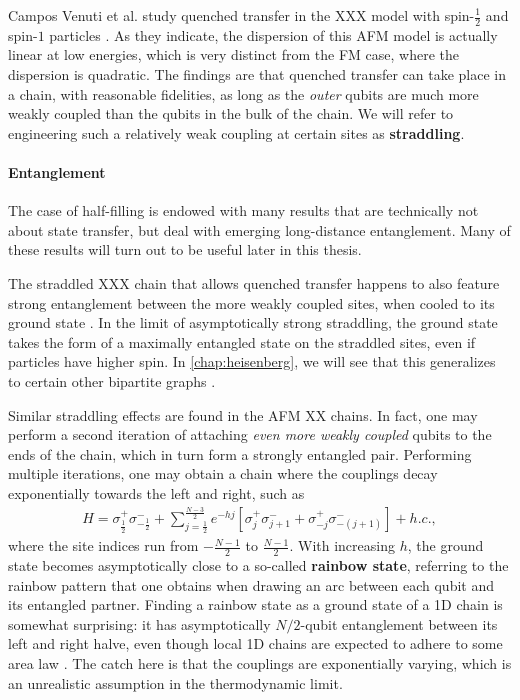 Campos Venuti et al. study quenched transfer in the XXX model with spin-$\frac{1}{2}$ and spin-$1$ particles  \cite{CamposVenuti2007}. As they indicate, the dispersion of this AFM model is actually linear at low energies, which is very distinct from the FM case, where the dispersion is quadratic. The findings are that quenched transfer can take place in a chain, with reasonable fidelities, as long as the \emph{outer} qubits are much more weakly coupled than the qubits in the bulk of the chain. We will refer to engineering such a relatively weak coupling at certain sites as \textbf{straddling}. 


\paragraph{Entanglement}
The case of half-filling is endowed with many results that are technically not about state transfer, but deal with emerging long-distance entanglement. Many of these results will turn out to be useful later in this thesis. 

The straddled XXX chain that allows quenched transfer happens to also feature strong entanglement between the more weakly coupled sites, when cooled to its ground state \cite{CamposVenuti2006, CamposVenuti2007}. In the limit of asymptotically strong straddling, the ground state takes the form of a maximally entangled state on the straddled sites, even if particles have higher spin.  In \cref{chap:heisenberg}, we will see that this generalizes to certain other bipartite graphs \cite{Groenland2019}.

Similar straddling effects are found in the AFM XX chains. In fact, one may perform a second iteration of attaching \emph{even more weakly coupled} qubits to the ends of the chain, which in turn form a strongly entangled pair. Performing multiple iterations, one may obtain a chain where the couplings decay exponentially towards the left and right, such as  \cite{Vitagliano2010,Ramirez2018}
\begin{align*}
H = \sigma_{\frac{1}{2}}^+ \sigma_{-\frac{1}{2}}^- +  \sum_{j=\frac{1}{2}}^{\frac{N-3}{2}} e^{-h j} \left[ \sigma_j^+ \sigma_{j+1}^- + \sigma_{-j}^+ \sigma_{-(j+1)}^- \right] + h.c.,
\end{align*}
where the site indices run from $-\frac{N-1}{2}$ to $\frac{N-1}{2}$. With increasing $h$, the ground state becomes asymptotically close to a so-called \textbf{rainbow state}, referring to the rainbow pattern that one obtains when drawing an arc between each qubit and its entangled partner. 
Finding a rainbow state as a ground state of a 1D chain is somewhat surprising: it has asymptotically $N/2$-qubit entanglement between its left and right halve, even though local 1D chains are expected to adhere to some area law \cite{Eisert2010}. The catch here is that the couplings are exponentially varying, which is an unrealistic assumption in the thermodynamic limit. 

